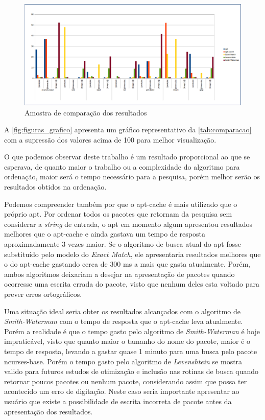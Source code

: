 \begin{figure}[h]
  \centering
	\includegraphics[width=\textwidth,angle=0]{figuras/grafico}
  \caption{Amostra de comparação dos resultados}
  \label{fig:figuras_grafico}
\end{figure}

A \autoref{fig:figuras_grafico} apresenta um gráfico representativo da \autoref{tab:comparacao} com a supressão dos valores acima de 100  para melhor visualização.

O que podemos observar deste trabalho é um resultado proporcional ao que se esperava, de quanto maior o trabalho ou a complexidade do algoritmo para ordenação, maior será o tempo necessário para a pesquisa, porém melhor serão os resultados obtidos na ordenação.

Podemos compreender também por que o {\code apt-cache} é mais utilizado que o próprio {\code apt}. Por ordenar todos os pacotes que retornam da pesquisa sem considerar a \textit{string} de entrada, o {\code apt} em momento algum apresentou resultados melhores que o {\code apt-cache} e ainda gastava um tempo de resposta aproximadamente 3 vezes maior. Se o algoritmo de busca atual do {\code apt} fosse substituído pelo modelo do \textit{Exact Match}, ele apresentaria resultados melhores que o do {\code apt-cache} gastando cerca de $300$ ms a mais que gasta atualmente. Porém, ambos algoritmos deixariam a desejar na apresentação de pacotes quando ocorresse uma escrita errada do pacote, visto que nenhum deles esta voltado para prever erros ortográficos.

Uma situação ideal seria obter os resultados alcançados com o algoritmo de \textit{Smith-Waterman} com o tempo de resposta que o {\code apt-cache} leva atualmente. Porém a realidade é que o tempo gasto pelo algoritmo de \textit{Smith-Waterman} é hoje impraticável, visto que quanto maior o tamanho do nome do pacote, maior é o tempo de resposta, levando a gastar quase 1 minuto para uma busca pelo pacote {\code ncurses-base}. Porém o tempo gasto pelo algoritmo de 
\textit{Levenshtein} se mostra valido para futuros estudos de otimização e inclusão nas rotinas de busca quando retornar poucos pacotes ou nenhum pacote, considerando assim que possa ter acontecido um erro de digitação. Neste caso seria importante apresentar ao usuário que existe a possibilidade de escrita incorreta de pacote antes da apresentação dos resultados.